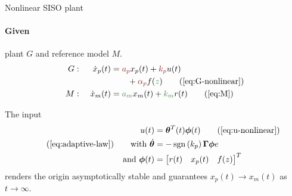 \begin{thrm}{Nonlinear SISO plant}
\paragraph{Given} plant $G$ and reference model $M$.
\begin{alignat*}{3}
G&:~ &
    \dot{x}_p(t) &= \unknownVar{a_p} x_p(t) + \unknownVar{k_p} u(t) \\
          &&& \quad \quad + \unknownVar{\alpha_p} f(\knownVar{z})
    \tag{\ref{eq:G-nonlinear}}\\
M&:~ &
    \dot{x}_m(t) &= \knownVar{a_m} x_m(t) + \knownVar{k_m} r(t)
    \tag{\ref{eq:M}}
\end{alignat*}

The input
\begin{alignat*}{3}
u(t) &= \bm{\theta}^T(t) \bm{\phi}(t) \tag{\ref{eq:u-nonlinear}}\\
    \tag{\ref{eq:adaptive-law}}
    \qquad \txt{with } \dot{ \bm{\theta}} &= -\sgn{k_p} \bm{\Gamma} \bm{\phi} e\\
    \qquad \txt{and } \bm{\phi}(t) &= \matr{r(t) & x_p(t) & f(z)}^T
\end{alignat*}
renders the origin asymptotically stable and guarantees
$x_p(t) \rightarrow x_m(t)$ as $t \rightarrow \infty$.
\end{thrm}~

